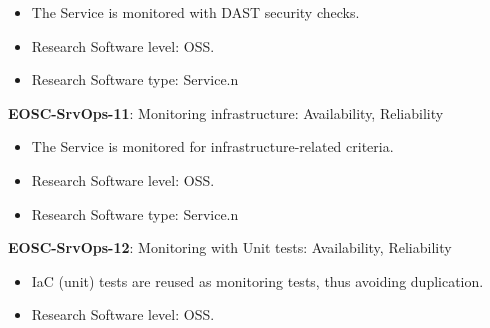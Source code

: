 \begin{itemize}
    \item The Service is monitored with DAST security checks. \cite{orviz_fernandez_eosc-synergy_2020}
    \item Research Software level: OSS.
    \item Research Software type: Service.n\end{itemize}

\textbf{EOSC-SrvOps-11}: Monitoring infrastructure: Availability, Reliability

\begin{itemize}
    \item The Service is monitored for infrastructure-related criteria. \cite{orviz_fernandez_eosc-synergy_2020}
    \item Research Software level: OSS.
    \item Research Software type: Service.n\end{itemize}

\textbf{EOSC-SrvOps-12}: Monitoring with Unit tests: Availability, Reliability

\begin{itemize}
    \item IaC (unit) tests are reused as monitoring tests, thus avoiding duplication. \cite{orviz_fernandez_eosc-synergy_2020}
    \item Research Software level: OSS.
\end{itemize}

